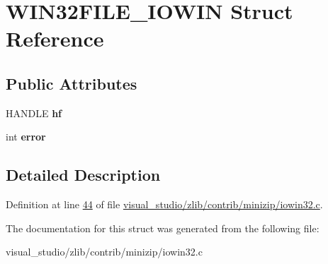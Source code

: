\hypertarget{struct_w_i_n32_f_i_l_e___i_o_w_i_n}{}\section{W\+I\+N32\+F\+I\+L\+E\+\_\+\+I\+O\+W\+IN Struct Reference}
\label{struct_w_i_n32_f_i_l_e___i_o_w_i_n}
\subsection*{Public Attributes}
\begin{DoxyCompactItemize}
\item 
\mbox{\label{struct_w_i_n32_f_i_l_e___i_o_w_i_n_aef23f62010af57376fd452e88c602214}} 
H\+A\+N\+D\+LE {\bfseries hf}
\item 
\mbox{\label{struct_w_i_n32_f_i_l_e___i_o_w_i_n_a074fe7f1d96aad43a9e2a4c575dfebb9}} 
int {\bfseries error}
\end{DoxyCompactItemize}


\subsection{Detailed Description}


Definition at line \hyperlink{visual__studio_2zlib_2contrib_2minizip_2iowin32_8c_source_l00044}{44} of file \hyperlink{visual__studio_2zlib_2contrib_2minizip_2iowin32_8c_source}{visual\+\_\+studio/zlib/contrib/minizip/iowin32.\+c}.



The documentation for this struct was generated from the following file\+:\begin{DoxyCompactItemize}
\item 
visual\+\_\+studio/zlib/contrib/minizip/iowin32.\+c\end{DoxyCompactItemize}
